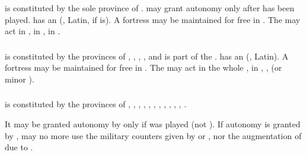 \subsubsection{}
\aparag {} is constituted by the sole province of
. \SPA may grant autonomy only after
 has been played.
\aparag {} has an \ARMY\faceplus (\CAIII, Latin, \TTER if
\SPA is).
\bparag A fortress may be maintained for free in .
\bparag The \ARMY may act in , in ,
in .


\subsubsection{}
\aparag {} is constituted by the provinces of
, , ,
, and is part of the \HRE.
\aparag {} has an \ARMY\faceplus (\CAIII, Latin).
\bparag A fortress may be maintained for free in .
\bparag The \ARMY may act in the whole \HRE, in ,
,  (or minor ).


\subsubsection{}
\aparag {} is constituted by the provinces of
, , ,
, , ,
, , ,
, , .

\bparag It may be granted autonomy by \SPA only if  was played (not ).
\bparag If autonomy is granted by \AUS, \AUS may no more use the
military counters given by  or
, nor the augmentation of  due to .

